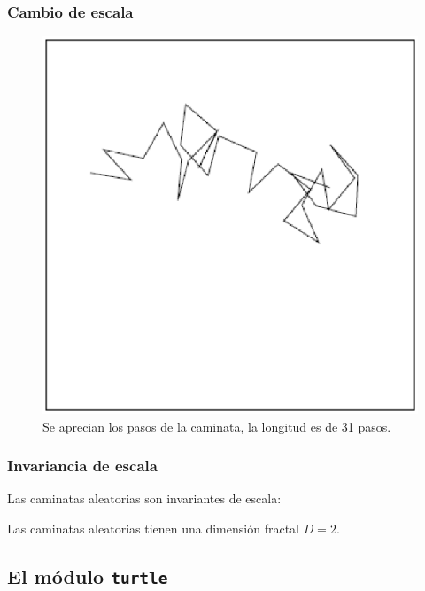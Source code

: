 \documentclass[12pt]{beamer}
\begin{document}
\begin{frame}
\frametitle{Cambio de escala}
\begin{figure}
	\centering
	\includegraphics[scale=0.5]{Imagenes/caminataAleatoria_06.eps}
	\caption{Se aprecian los pasos de la caminata, la longitud es de 31 pasos.}
\end{figure}
\end{frame}
\begin{frame}
\frametitle{Invariancia de escala}
Las caminatas aleatorias son invariantes de escala:
\\
\bigskip
\pause
\begin{center}
\end{center}
\pause
Las caminatas aleatorias tienen una dimensión fractal $D = 2$.
\end{frame}

\subsection{El módulo \texttt{turtle}}
\end{document}

